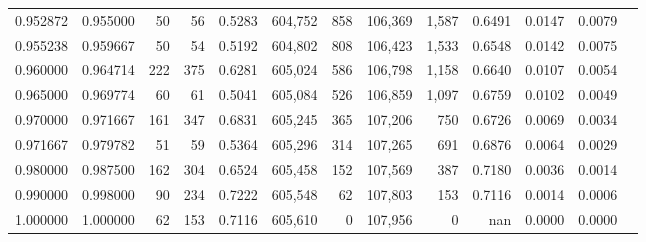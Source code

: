 \begin{tabular}{rrrrrrrrrrrrr}
0.952872 & 0.955000 &    50 &  56 &                                     0.5283 & 604,752 &     858 & 106,369 &   1,587 & 0.6491 & 0.0147 & 0.0079 \\
0.955238 & 0.959667 &    50 &  54 &                                     0.5192 & 604,802 &     808 & 106,423 &   1,533 & 0.6548 & 0.0142 & 0.0075 \\
0.960000 & 0.964714 &   222 & 375 &                                     0.6281 & 605,024 &     586 & 106,798 &   1,158 & 0.6640 & 0.0107 & 0.0054 \\
0.965000 & 0.969774 &    60 &  61 &                                     0.5041 & 605,084 &     526 & 106,859 &   1,097 & 0.6759 & 0.0102 & 0.0049 \\
0.970000 & 0.971667 &   161 & 347 &                                     0.6831 & 605,245 &     365 & 107,206 &     750 & 0.6726 & 0.0069 & 0.0034 \\
0.971667 & 0.979782 &    51 &  59 &                                     0.5364 & 605,296 &     314 & 107,265 &     691 & 0.6876 & 0.0064 & 0.0029 \\
0.980000 & 0.987500 &   162 & 304 &                                     0.6524 & 605,458 &     152 & 107,569 &     387 & 0.7180 & 0.0036 & 0.0014 \\
0.990000 & 0.998000 &    90 & 234 &                                     0.7222 & 605,548 &      62 & 107,803 &     153 & 0.7116 & 0.0014 & 0.0006 \\
1.000000 & 1.000000 &    62 & 153 &                                     0.7116 & 605,610 &       0 & 107,956 &       0 &    nan & 0.0000 & 0.0000 \\
\bottomrule
\end{tabular}
